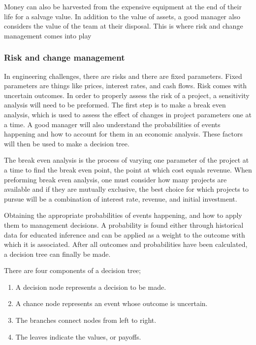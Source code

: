 \documentclass[12pt,a4paper]{report}
\begin{document}
    Money can also be harvested from the expensive equipment at the end of their life for a salvage value. In addition to the value of assets, a good manager also considers the value of the team at their disposal. This is where risk and change management comes into play
    
    \subsubsection{Risk and change management}
    
    In engineering challenges, there are risks and there are fixed parameters. Fixed parameters are things like prices, interest rates, and cash flows. Risk comes with uncertain outcomes. In order to properly assess the risk of a project, a sensitivity analysis will need to be preformed. The first step is to make a break even analysis, which is used to assess the effect of changes in project parameters one at a time. A good manager will also understand the probabilities of events happening and how to account for them in an economic analysis. These factors will then be used to make a decision tree.\par
    
    The break even analysis is the process of varying one parameter of the project at a time to find the break even point, the point at which cost equals revenue. When preforming break even analysis, one must consider how many projects are available and if they are mutually exclusive, the best choice for which projects to pursue will be a combination of interest rate, revenue, and initial investment.\par
    
    Obtaining the appropriate probabilities of events happening, and how to apply them to management decisions. A probability is found either through historical data for educated inference and can be applied as a weight to the outcome with which it is associated. After all outcomes and probabilities have been calculated, a decision tree can finally be made. \par
    
    There are four components of a decision tree;
    
    \begin{enumerate}
        \item  A decision node represents a decision to be made.
        \item  A chance node represents an event whose outcome is uncertain.
        \item  The branches connect nodes from left to right.
        \item  The leaves indicate the values, or payoffs.
    \end{enumerate}
    
\end{document}
